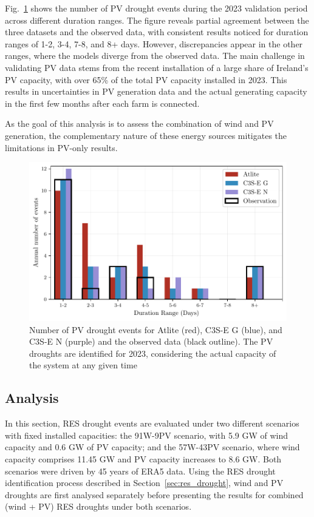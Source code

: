 \documentclass[preprint, 12pt]{elsarticle}
\begin{document}
Fig.~\ref{fig:bar_number_events_verification_pv} shows the number of PV drought events during the 2023 validation period across different duration ranges. The figure reveals partial agreement between the three datasets and the observed data, with consistent results noticed for duration ranges of 1-2, 3-4, 7-8, and 8+ days. However, discrepancies appear in the other ranges, where the models diverge from the observed data. The main challenge in validating PV data stems from the recent installation of a large share of Ireland’s PV capacity, with over 65\% of the total PV capacity installed in 2023. This results in uncertainties in PV generation data and the actual generating capacity in the first few months after each farm is connected.

As the goal of this analysis is to assess the combination of wind and PV generation, the complementary nature of these energy sources mitigates the limitations in PV-only results.

\begin{figure}[!ht]
	\centering
	\includegraphics[width=\textwidth]{verification_pv_number_events.pdf}
	\caption{Number of PV drought events for Atlite (red), C3S-E G (blue), and C3S-E N (purple) and the observed data (black outline). The PV droughts are identified for 2023, considering the actual capacity of the system at any given time}
	\label{fig:bar_number_events_verification_pv}
\end{figure}

\subsection{Analysis}
\label{sec:analysis}

In this section, RES drought events are evaluated under two different scenarios with fixed installed capacities: the 91W-9PV scenario, with 5.9 GW of wind capacity and 0.6 GW of PV capacity; and the 57W-43PV scenario, where wind capacity comprises 11.45 GW and PV capacity increases to 8.6 GW. Both scenarios were driven by 45 years of ERA5 data. Using the RES drought identification process described in Section~\ref{sec:res_drought}, wind and PV droughts are first analysed separately before presenting the results for combined (wind + PV) RES droughts under both scenarios.
\end{document}
